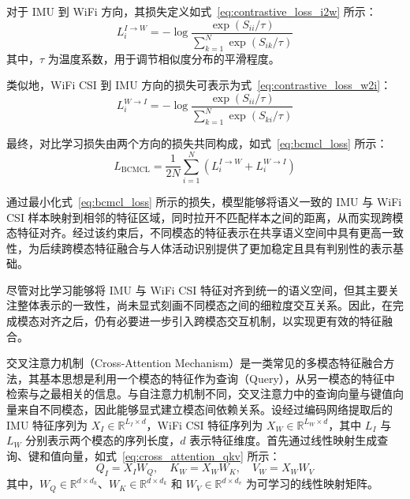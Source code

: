 对于 IMU 到 WiFi 方向，其损失定义如式~\eqref{eq:contrastive_loss_i2w} 所示：
\begin{equation}
L_i^{I \rightarrow W} =
-\log
\frac{\exp(S_{ii}/\tau)}
{\sum_{k=1}^{N}\exp(S_{ik}/\tau)}
\label{eq:contrastive_loss_i2w}
\end{equation}
其中，$\tau$ 为温度系数，用于调节相似度分布的平滑程度。

类似地，WiFi CSI 到 IMU 方向的损失可表示为式~\eqref{eq:contrastive_loss_w2i}：
\begin{equation}
L_i^{W \rightarrow I} =
-\log
\frac{\exp(S_{ii}/\tau)}
{\sum_{k=1}^{N}\exp(S_{ki}/\tau)}
\label{eq:contrastive_loss_w2i}
\end{equation}

最终，对比学习损失由两个方向的损失共同构成，如式~\eqref{eq:bcmcl_loss} 所示：
\begin{equation}
L_{\mathrm{BCMCL}} =
\frac{1}{2N}
\sum_{i=1}^{N}
\left(
L_i^{I \rightarrow W} +
L_i^{W \rightarrow I}
\right)
\label{eq:bcmcl_loss}
\end{equation}

通过最小化式~\eqref{eq:bcmcl_loss} 所示的损失，模型能够将语义一致的 IMU 与 WiFi CSI 样本映射到相邻的特征区域，同时拉开不匹配样本之间的距离，从而实现跨模态特征对齐。经过该约束后，不同模态的特征表示在共享语义空间中具有更高一致性，为后续跨模态特征融合与人体活动识别提供了更加稳定且具有判别性的表示基础\cite{li2025multiEntityAlignment,yang2024multimodalCode,yin2023dualContrastive}。


尽管对比学习能够将 IMU 与 WiFi CSI 特征对齐到统一的语义空间，但其主要关注整体表示的一致性，尚未显式刻画不同模态之间的细粒度交互关系。因此，在完成模态对齐之后，仍有必要进一步引入跨模态交互机制，以实现更有效的特征融合\cite{oh2024multi,khan2025encoding,yin2023fineGrainedFusion}。

交叉注意力机制（Cross-Attention Mechanism）是一类常见的多模态特征融合方法，其基本思想是利用一个模态的特征作为查询（Query），从另一模态的特征中检索与之最相关的信息。与自注意力机制不同，交叉注意力中的查询向量与键值向量来自不同模态，因此能够显式建立模态间依赖关系。设经过编码网络提取后的 IMU 特征序列为 $X_I \in \mathbb{R}^{L_I \times d}$，WiFi CSI 特征序列为 $X_W \in \mathbb{R}^{L_W \times d}$，其中 $L_I$ 与 $L_W$ 分别表示两个模态的序列长度，$d$ 表示特征维度。首先通过线性映射生成查询、键和值向量，如式~\eqref{eq:cross_attention_qkv} 所示：
\begin{equation}
Q_I = X_I W_Q, \quad
K_W = X_W W_K, \quad
V_W = X_W W_V
\label{eq:cross_attention_qkv}
\end{equation}
其中，$W_Q \in \mathbb{R}^{d \times d_k}$、$W_K \in \mathbb{R}^{d \times d_k}$ 和 $W_V \in \mathbb{R}^{d \times d_v}$ 为可学习的线性映射矩阵。

